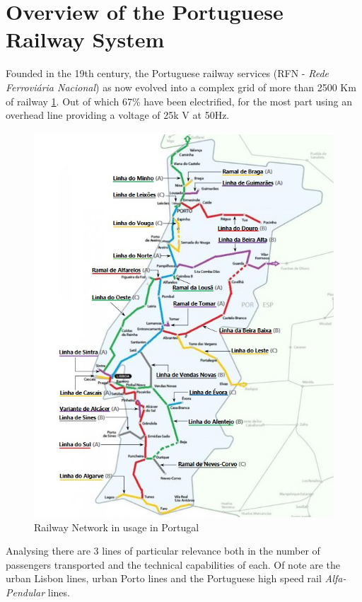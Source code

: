 \section{Overview of the Portuguese Railway System}
Founded in the 19th century, the Portuguese railway services (RFN - \textit{Rede Ferroviária Nacional}) as now evolved into a complex grid of more than 2500 Km of railway \ref{fig:CPLines}. Out of which 67\% have been electrified, for the most part using an overhead line providing a voltage of 25k V at 50Hz. 
\begin{figure}[h]
    \centering
    \includegraphics[scale = 0.5]{Figures/CPLines.jpg}
    \caption{Railway Network in usage in Portugal}
    \label{fig:CPLines}
\end{figure}
Analysing \cite{CP_accounting} there are 3 lines of particular relevance both in the number of passengers transported and the technical capabilities of each. Of note are the urban Lisbon lines, urban Porto lines and the Portuguese high speed rail \textit{Alfa-Pendular} lines.

